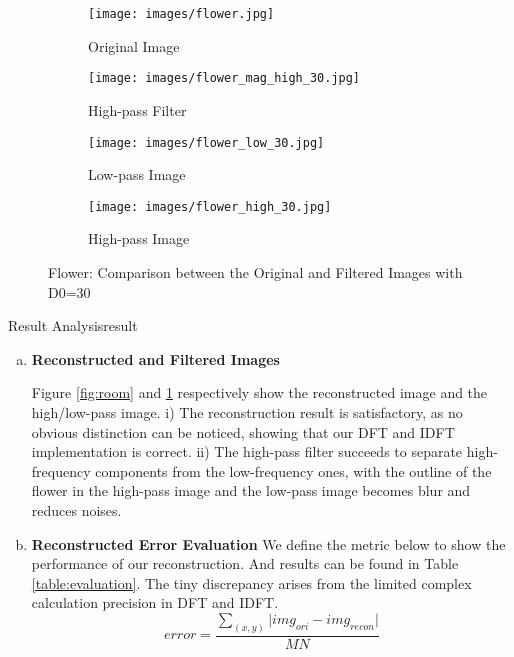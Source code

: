 \begin{figure}[htbp]
    \centering 
    \begin{minipage}{0.8\textwidth} 
        \centering 
        
        \begin{subfigure}[b]{0.45\linewidth} 
            \texttt{[image: images/flower.jpg]}
            \caption{Original Image}
        \end{subfigure}
        \hfill
        \begin{subfigure}[b]{0.45\linewidth}
            \texttt{[image: images/flower\_mag\_high\_30.jpg]}
            \caption{High-pass Filter}
        \end{subfigure}

        \vspace{0.5cm}
        \begin{subfigure}[b]{0.45\linewidth}
            \texttt{[image: images/flower\_low\_30.jpg]}
            \caption{Low-pass Image}
        \end{subfigure}
        \hfill
        \begin{subfigure}[b]{0.45\linewidth}
            \texttt{[image: images/flower\_high\_30.jpg]}
            \caption{High-pass Image}
        \end{subfigure}

        \caption{Flower: Comparison between the Original and Filtered Images with D0=30}
        \label{fig:flower}
    \end{minipage}
\end{figure}



\begin{problem}{Result Analysis}{result}

\begin{enumerate}[(a)]
    \item \textbf{Reconstructed and Filtered Images}
    
    Figure \ref{fig:room} and \ref{fig:flower} respectively show the reconstructed image and the high/low-pass image. i) The reconstruction result is satisfactory, as no obvious distinction can be noticed, showing that our DFT and IDFT implementation is correct. ii) The high-pass filter succeeds to separate high-frequency components from the low-frequency ones, with the outline of the flower in the high-pass image and the low-pass image becomes blur and reduces noises.
    \item \textbf{Reconstructed Error Evaluation}
    We define the metric below to show the performance of our reconstruction. And results can be found in Table \ref{table:evaluation}. The tiny discrepancy arises from the limited complex calculation precision in DFT and IDFT.
    $$error = \frac{\sum_{(x,y)} \vert img_{ori} - img_{recon}\vert} {MN}$$
\end{enumerate}
\end{problem}

